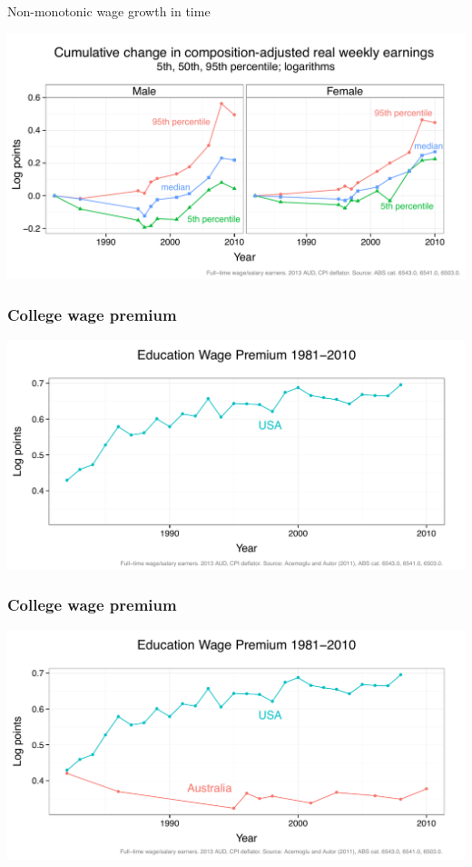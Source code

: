 \documentclass[red]{beamer}
\begin{document}
\begin{frame}{Non-monotonic wage growth in time}
  \begin{center}
    \includegraphics[width=\textwidth]{slides_fig/wage_change_time.pdf}
  \end{center}
\end{frame}

\begin{frame}
  \frametitle{College wage premium}
  \begin{center}
    \includegraphics[width=\textwidth]{slides_fig/ed_premium_us.pdf}
  \end{center}
\end{frame}

\begin{frame}
  \frametitle{College wage premium}
  \begin{center}
    \includegraphics[width=\textwidth]{slides_fig/ed_premium.pdf}
  \end{center}
\end{frame}
\end{document}
